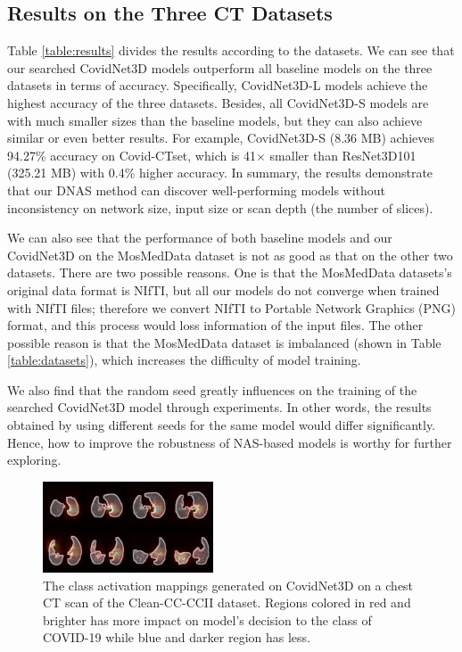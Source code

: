 \documentclass[letterpaper]{article}
\begin{document}

\subsection{Results on the Three CT Datasets}

Table \ref{table:results} divides the results according to the datasets. We can see that our searched CovidNet3D models outperform all baseline models on the three datasets in terms of accuracy. Specifically, CovidNet3D-L models achieve the highest accuracy of the three datasets. Besides, all CovidNet3D-S models are with much smaller sizes than the baseline models, but they can also achieve similar or even better results. For example, CovidNet3D-S (8.36 MB) achieves 94.27\% accuracy on Covid-CTset, which is 41$\times$ smaller than ResNet3D101 (325.21 MB) with 0.4\% higher accuracy. In summary, the results demonstrate that our DNAS method can discover well-performing models without inconsistency on network size, input size or scan depth (the number of slices).

We can also see that the performance of both baseline models and our CovidNet3D on the MosMedData dataset is not as good as that on the other two datasets. There are two possible reasons. One is that the MosMedData datasets's original data format is NIfTI, but all our models do not converge when trained with NIfTI files; therefore we convert NIfTI to Portable Network Graphics (PNG) format, and this process would loss information of the input files. The other possible reason is that the MosMedData dataset is imbalanced (shown in Table \ref{table:datasets}), which increases the difficulty of model training. 

We also find that the random seed greatly influences on the training of the searched CovidNet3D model through experiments. In other words, the results obtained by using different seeds for the same model would differ significantly. Hence, how to improve the robustness of NAS-based models is worthy for further exploring.


\begin{figure}[!ht]
    \centering
    \includegraphics[width=0.45\textwidth]{images/heatmap.png}
    \caption{The class activation mappings generated on CovidNet3D on a chest CT scan of the Clean-CC-CCII dataset. Regions colored in red and brighter has more impact on model's decision to the class of COVID-19 while blue and darker region has less.}
    \label{fig:cam}
\end{figure}
\end{document}
